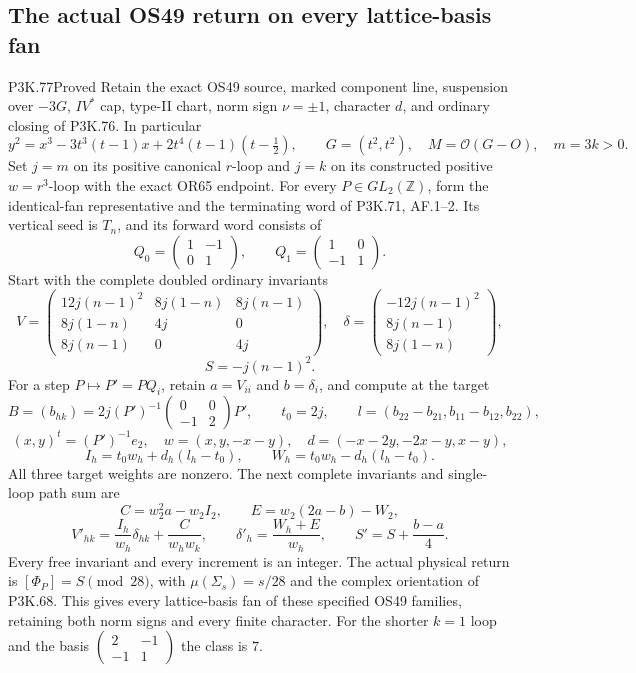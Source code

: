\subsection{The actual OS49 return on every lattice-basis fan}
\begin{statement}{P3K.77}{Proved}
Retain the exact OS49 source, marked component line, suspension over
\(-3G\), \(IV^*\) cap, type-II chart, norm sign \(\nu=\pm1\),
character \(d\), and ordinary closing of P3K.76. In particular
\[
 y^2=x^3-3t^3(t-1)x+2t^4(t-1)(t-\tfrac12),\qquad
 G=(t^2,t^2),\quad M=\mathcal O(G-O),\quad m=3k>0.
\]
Set \(j=m\) on its positive canonical \(r\)-loop and \(j=k\)
on its constructed positive \(w=r^3\)-loop with the exact OR65
endpoint. For every \(P\in GL_2(\mathbb Z)\), form the identical-fan
representative and the terminating word of P3K.71, AF.1--2.
Its vertical seed is \(T_n\), and its forward word consists of
\[
 Q_0=\begin{pmatrix}1&-1\\0&1\end{pmatrix},\qquad
 Q_1=\begin{pmatrix}1&0\\-1&1\end{pmatrix}.
\]
Start with the complete doubled ordinary invariants
\[
 V=\begin{pmatrix}
 12j(n-1)^2&8j(1-n)&8j(n-1)\\
 8j(1-n)&4j&0\\8j(n-1)&0&4j
 \end{pmatrix},\quad
 \delta=\begin{pmatrix}-12j(n-1)^2\\8j(n-1)\\8j(1-n)\end{pmatrix},
\]
\[
                         S=-j(n-1)^2.                 \tag{OF.1}
\]
For a step \(P\mapsto P'=PQ_i\), retain \(a=V_{ii}\) and
\(b=\delta_i\), and compute at the target
\[
 B=(b_{hk})=2j(P')^{-1}
           \begin{pmatrix}0&0\\-1&2\end{pmatrix}P',\qquad
 t_0=2j,\qquad
 l=(b_{22}-b_{21},b_{11}-b_{12},b_{22}),
\]
\[
 (x,y)^t=(P')^{-1}e_2,\quad
 w=(x,y,-x-y),\quad d=(-x-2y,-2x-y,x-y),
\]
\[
 I_h=t_0w_h+d_h(l_h-t_0),\qquad
 W_h=t_0w_h-d_h(l_h-t_0).                             \tag{OF.2}
\]
All three target weights are nonzero. The next complete invariants
and single-loop path sum are
\[
 C=w_2^2a-w_2I_2,\qquad E=w_2(2a-b)-W_2,
\]
\[
 V'_{hk}=\frac{I_h}{w_h}\delta_{hk}+\frac{C}{w_hw_k},\qquad
 \delta'_h=\frac{W_h+E}{w_h},\qquad
 S'=S+\frac{b-a}{4}.                                 \tag{OF.3}
\]
Every free invariant and every increment is an integer. The
actual physical return is \([\Phi_P]=S\pmod {28}\), with
\(\mu(\Sigma_s)=s/28\) and the complex orientation of P3K.68.
This gives every lattice-basis fan of these specified OS49
families, retaining both norm signs and every finite character.
For the shorter \(k=1\) loop and the basis
\(\left(\begin{smallmatrix}2&-1\\-1&1\end{smallmatrix}\right)\)
the class is \(7\).


\end{statement}
